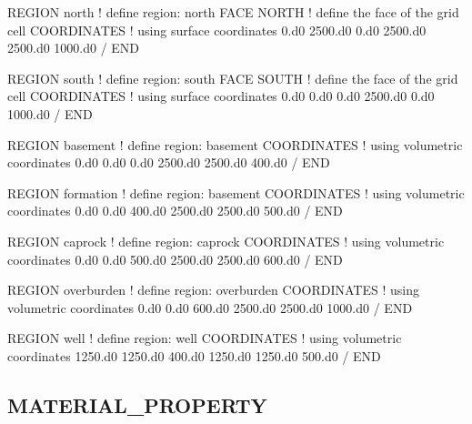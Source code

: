 \documentclass{beamer}
\newcommand\redcomment[1]{{{\color{red} #1}}}
\newcommand\bluecomment[1]{{{\color{blue} #1}}}
\newcommand\greencomment[1]{{{\color{green} #1}}}
\begin{document}
\begin{frame}
\begin{semiverbatim}
\newpage
REGION north            \bluecomment{! define region:} \greencomment{north}
  FACE NORTH            \bluecomment{! define the face of the grid cell}
  COORDINATES           \bluecomment{! using \redcomment{surface} coordinates}
    0.d0 2500.d0 0.d0
    2500.d0 2500.d0 1000.d0
  /
END

REGION south            \bluecomment{! define region:} \greencomment{south}
  FACE SOUTH            \bluecomment{! define the face of the grid cell}
  COORDINATES           \bluecomment{! using \redcomment{surface} coordinates}
    0.d0 0.d0 0.d0
    2500.d0 0.d0 1000.d0
  /
END

REGION basement         \bluecomment{! define region:} \greencomment{basement}
  COORDINATES           \bluecomment{! using \redcomment{volumetric} coordinates}
    0.d0 0.d0 0.d0
    2500.d0 2500.d0 400.d0
  /
END

REGION formation         \bluecomment{! define region:} \greencomment{basement}
  COORDINATES            \bluecomment{! using \redcomment{volumetric} coordinates}
    0.d0 0.d0 400.d0
    2500.d0 2500.d0 500.d0
  /
END

\newpage
REGION caprock          \bluecomment{! define region:} \greencomment{caprock}
  COORDINATES           \bluecomment{! using \redcomment{volumetric} coordinates}
    0.d0 0.d0 500.d0
    2500.d0 2500.d0 600.d0
  /
END

REGION overburden         \bluecomment{! define region:} \greencomment{overburden}
  COORDINATES             \bluecomment{! using \redcomment{volumetric} coordinates}
    0.d0 0.d0 600.d0
    2500.d0 2500.d0 1000.d0
  /
END

\newpage
REGION well               \bluecomment{! define region:} \greencomment{well}
  COORDINATES             \bluecomment{! using \redcomment{volumetric} coordinates}
    1250.d0 1250.d0 400.d0
    1250.d0 1250.d0 500.d0
  /
END

\end{semiverbatim}

\end{frame}

\subsection{MATERIAL\_PROPERTY}
\end{document}
